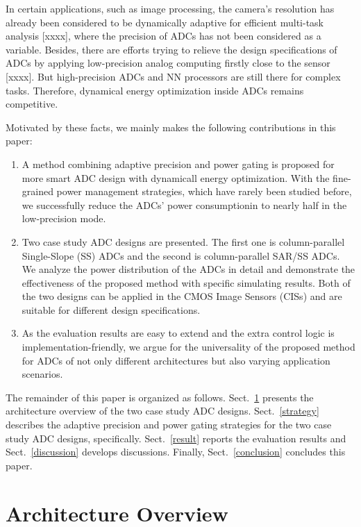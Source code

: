 \documentclass[conference]{IEEEtran}
\begin{document}
In certain applications, such as image processing, the camera’s resolution has already been considered to be dynamically adaptive for efficient multi-task analysis [xxxx], where the precision of ADCs has not been considered as a variable. Besides, there are efforts trying to relieve the design specifications of ADCs by applying low-precision analog computing firstly close to the sensor [xxxx]. But high-precision ADCs and NN processors are still there for complex tasks. Therefore, dynamical energy optimization inside ADCs remains competitive.

Motivated by these facts, we mainly makes the following contributions in this paper:
\begin{enumerate}[\IEEEsetlabelwidth{3)}]
	\item A method combining adaptive precision and power gating is proposed for more smart ADC design with dynamicall energy optimization. With the fine-grained power management strategies, which have rarely been studied before, we successfully reduce the ADCs' power consumptionin to nearly half in the low-precision mode.
	\item Two case study ADC designs are presented. The first one is column-parallel Single-Slope (SS) ADCs and the second is column-parallel SAR/SS ADCs. We analyze the power distribution of the ADCs in detail and demonstrate the effectiveness of the proposed method with specific simulating results. Both of the two designs can be applied in the CMOS Image Sensors (CISs) and are suitable for different design specifications. 
	\item As the evaluation results are easy to extend and the extra control logic is implementation-friendly, we argue for the universality of the proposed method for ADCs of not only different architectures but also varying application scenarios.
\end{enumerate} 

The remainder of this paper is organized as follows. Sect.~\ref{architecture} presents the architecture overview of the two case study ADC designs. Sect.~\ref{strategy} describes the adaptive precision and power gating strategies for the two case study ADC designs, specifically. Sect.~\ref{result} reports the evaluation results and Sect.~\ref{discussion} develops discussions. Finally, Sect.~\ref{conclusion} concludes this paper.

\section{Architecture Overview}\label{architecture}
\end{document}
